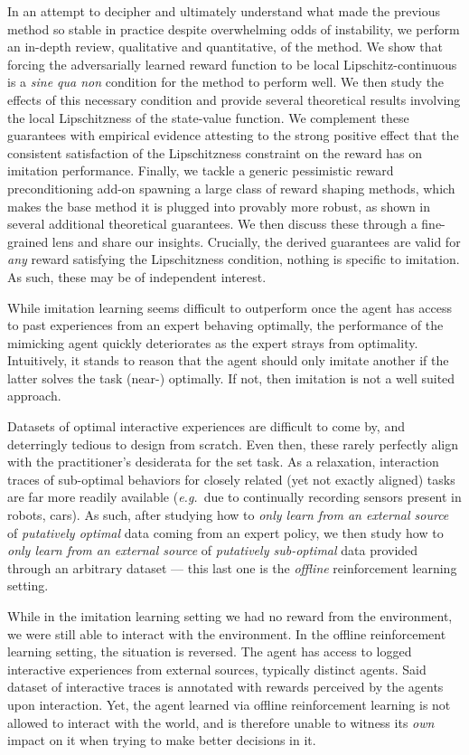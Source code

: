 In an attempt to decipher and ultimately understand what made
the previous method so stable in practice despite overwhelming odds of instability, we
perform an in-depth review, qualitative and quantitative, of the method.
We show that forcing the adversarially learned reward function to be local Lipschitz-continuous
is a \textit{sine qua non} condition for the method to perform well.
We then study the effects of this necessary condition and provide several theoretical results
involving the local Lipschitzness of the state-value function.
We complement these guarantees with empirical evidence attesting to the strong
positive effect that the consistent satisfaction of the Lipschitzness constraint on the reward has
on imitation performance.
Finally, we tackle a generic pessimistic reward preconditioning add-on
spawning a large class of reward shaping methods, which
makes the base method it is plugged into provably more robust, as shown in several
additional theoretical guarantees.
We then discuss these through a fine-grained lens and share our insights.
Crucially, the derived guarantees are valid for \emph{any} reward
satisfying the Lipschitzness condition, nothing is specific to imitation.
As such, these may be of independent interest.

While imitation learning seems difficult to outperform
once the agent has access to past experiences from an expert behaving optimally,
the performance of the mimicking agent quickly deteriorates as the expert strays from optimality.
Intuitively, it stands to reason that the agent should only imitate another if the latter
solves the task (near-) optimally. If not, then imitation is not a well suited approach.

Datasets of optimal interactive experiences are difficult to come by,
and deterringly tedious to design from scratch.
Even then, these rarely perfectly align with the practitioner's desiderata for the set task.
As a relaxation, interaction traces of sub-optimal behaviors for closely related (yet not exactly aligned) tasks
are far more readily available
(\textit{e.g.}~due to continually recording sensors present in robots, cars).
As such, after studying how to \emph{only learn from an external source} of \emph{putatively optimal} data coming
from an expert policy, we then study how to \emph{only learn from an external source} of
\emph{putatively sub-optimal} data provided through an arbitrary dataset ---
this last one is the \emph{offline} reinforcement learning setting.

While in the imitation learning setting we had no reward from the environment,
we were still able to interact with the environment.
In the offline reinforcement learning setting, the situation is reversed.
The agent has access to logged interactive experiences from external sources, typically distinct agents.
Said dataset of interactive traces is annotated with rewards perceived by the agents upon interaction.
Yet, the agent learned via offline reinforcement learning
is not allowed to interact with the world, and is therefore unable to witness its \emph{own} impact on it when trying
to make better decisions in it.

